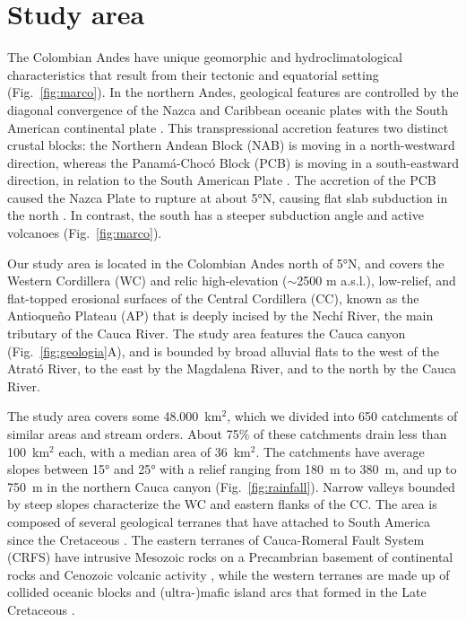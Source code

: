 \documentclass[draft]{agujournal2019}
\begin{document}
\section{Study area}
\par The Colombian Andes have unique geomorphic and hydroclimatological characteristics that result from their tectonic and equatorial setting (Fig.~\ref{fig:marco}). In the northern Andes, geological features are controlled by the diagonal convergence of the Nazca and Caribbean oceanic plates with the South American continental plate \cite{Cediel2003, acosta2007, trenkamp2002}. This transpressional accretion features two distinct crustal blocks: the Northern Andean Block (NAB) is moving in a north-westward direction, whereas the Panamá-Chocó Block (PCB) is moving in a south-eastward direction, in relation to the South American Plate \cite{kellogg1995}. The accretion of the PCB caused the Nazca Plate to rupture at about 5°N, causing flat slab subduction in the north \cite{Taboada2000}. In contrast, the south has a steeper subduction angle and active volcanoes \cite{perez2021, restrepo2019, farris2011, Taboada2000, mann1990} (Fig.~\ref{fig:marco}). 

\par Our study area is located in the Colombian Andes north of 5°N, and covers the Western Cordillera (WC) and relic high-elevation ($\sim$2500 m a.s.l.), low-relief, and flat-topped erosional surfaces of the Central Cordillera (CC), known as the Antioqueño Plateau (AP) that is deeply incised by the Nechí River, the main tributary of the Cauca River. The study area features the Cauca canyon (Fig.~\ref{fig:geologia}A), and is bounded by broad alluvial flats to the west of the Atrató River, to the east by the Magdalena River, and to the north by the Cauca River.

\par The study area covers some 48.000~km$^2$, which we divided into 650 catchments of similar areas and stream orders. About 75\% of these catchments drain less than 100~km$^{2}$ each, with a median area of 36~km$^{2}$. The catchments have average slopes between 15° and 25° with a relief ranging from 180~m to 380~m, and up to 750~m in the northern Cauca canyon (Fig.~\ref{fig:rainfall}). Narrow valleys bounded by steep slopes characterize the WC and eastern flanks of the CC. The area is composed of several geological terranes that have attached to South America since the Cretaceous \cite{Cediel2003}. The eastern terranes of Cauca-Romeral Fault System (CRFS) have intrusive Mesozoic rocks on a Precambrian basement of continental rocks and Cenozoic volcanic activity \cite{Cediel2003}, while the western terranes are made up of collided oceanic blocks and (ultra-)mafic island arcs that formed in the Late Cretaceous \cite{cardona2012arc}.
\end{document}
